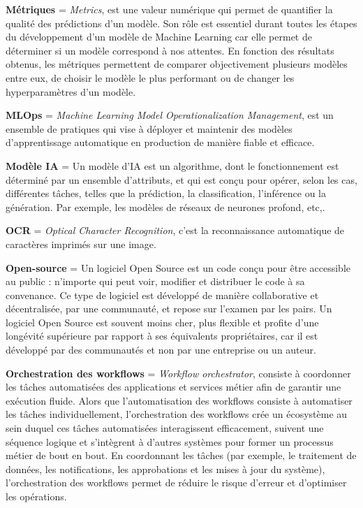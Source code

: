 \textbf{Métriques} = \textit{Metrics}, est une valeur numérique qui permet de quantifier la qualité des prédictions d’un modèle. Son rôle est essentiel durant toutes les étapes du développement d’un modèle de Machine Learning car elle permet de déterminer si un modèle correspond à nos attentes. En fonction des résultats obtenus, les métriques permettent de comparer objectivement plusieurs modèles entre eux, de choisir le modèle le plus performant ou de changer les hyperparamètres d’un modèle.

\textbf{MLOps} = \textit{Machine Learning Model Operationalization Management}, est un ensemble de pratiques qui vise à déployer et maintenir des modèles d'apprentissage automatique en production de manière fiable et efficace.

\textbf{Modèle IA} = Un modèle d’IA est un algorithme, dont le fonctionnement est déterminé par un ensemble d’attributs, et qui est conçu pour opérer, selon les cas, différentes tâches, telles que la prédiction, la classification, l’inférence ou la génération. Par exemple, les modèles de réseaux de neurones profond, etc,.

\textbf{OCR} = \textit{Optical Character Recognition}, c'est la reconnaissance automatique de caractères imprimés sur une image. 

\textbf{Open-source} = Un logiciel Open Source est un code conçu pour être accessible au public : n'importe qui peut voir, modifier et distribuer le code à sa convenance. Ce type de logiciel est développé de manière collaborative et décentralisée, par une communauté, et repose sur l'examen par les pairs. Un logiciel Open Source est souvent moins cher, plus flexible et profite d'une longévité supérieure par rapport à ses équivalents propriétaires, car il est développé par des communautés et non par une entreprise ou un auteur.

\textbf{Orchestration des workflows} = \textit{Workflow orchestrator}, consiste à coordonner les tâches automatisées des applications et services métier afin de garantir une exécution fluide. Alors que l’automatisation des workflows consiste à automatiser les tâches individuellement, l’orchestration des workflows crée un écosystème au sein duquel ces tâches automatisées interagissent efficacement, suivent une séquence logique et s’intègrent à d’autres systèmes pour former un processus métier de bout en bout. En coordonnant les tâches (par exemple, le traitement de données, les notifications, les approbations et les mises à jour du système), l’orchestration des workflows permet de réduire le risque d’erreur et d’optimiser les opérations.

